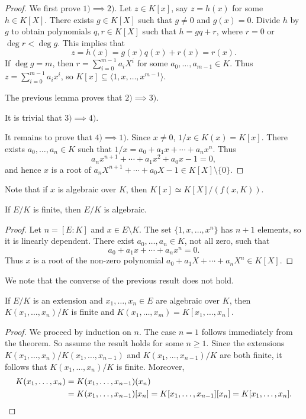 \begin{proof}
	We first prove $1)\implies 2)$. Let $z\in K[x]$, say $z=h(x)$ for some $h\in K[X]$. There exists
	$g\in K[X]$ such that $g\ne 0$ and $g(x)=0$. Divide $h$ by $g$ to obtain 
	polynomials $q,r\in K[X]$ such that $h=gq+r$, where $r=0$ or $\deg r<\deg g$. This implies that
	\[
		z=h(x)=g(x)q(x)+r(x)=r(x).
	\]
	If $\deg g=m$, then $r=\sum_{i=0}^{m-1}a_iX^i$ for some $a_0,\dots,a_{m-1}\in K$. Thus
	$z=\sum_{i=0}^{m-1}a_ix^i$, so $K[x]\subseteq\langle 1,x,\dots,x^{m-1}\rangle$. 

	The previous lemma proves that $2)\implies 3)$. 

	It is trivial that $3)\implies 4)$. 

	It remains to prove that $4)\implies 1)$. 
	Since $x\ne 0$, $1/x\in K(x)=K[x]$. There exists $a_0,\dots,a_n\in K$ such that
	$1/x=a_0+a_1x+\cdots+a_nx^n$. Thus
	\[
		a_nx^{n+1}+\cdots+a_1x^2+a_0x-1=0, 
	\]
	and hence $x$ is a root of $a_nX^{n+1}+\cdots+a_0X-1\in K[X]\setminus\{0\}$. 
\end{proof}

Note that if $x$ is algebraic over $K$, then
$K[x]\simeq K[X]/(f(x,K))$. 

\begin{corollary}
	If $E/K$ is finite, then $E/K$ is algebraic. 
\end{corollary}

\begin{proof}
	Let $n=[E:K]$ and $x\in E\setminus K$. The set $\{1,x,\dots,x^n\}$ has $n+1$ elements, so it is linearly dependent. 
	There exist $a_0,\dots,a_n\in K$, not all zero, such that
	\[
        a_0+a_1x+\cdots+a_nx^n=0.
        \]
        Thus $x$ is a root of the non-zero
	polynomial $a_0+a_1X+\cdots+a_nX^n\in K[X]$. 
\end{proof}

We note that the converse of the previous result does not hold. 

\begin{corollary}
	If $E/K$ is an extension and $x_1,\dots,x_n\in E$ 
	are algebraic over $K$, then 
	$K(x_1,\dots,x_n)/K$ is finite and
	$K(x_1,\dots,x_m)=K[x_1,\dots,x_n]$. 
\end{corollary}

\begin{proof}
	We proceed by induction on $n$. The case $n=1$ follows immediately from 
	the theorem. So assume the result holds for some $n\geq1$. Since the extensions 
	$K(x_1,\dots,x_n)/K(x_1,\dots,x_{n-1})$ and $K(x_1,\dots,x_{n-1})/K$ are
	both finite, it follows that $K(x_1,\dots,x_n)/K$ is finite. Moreover, 
	\begin{align*}
	K(x_1,\dots,x_n)&=K(x_1,\dots,x_{n-1})(x_n)\\
	&=K(x_1,\dots,x_{n-1})[x_n]=K[x_1,\dots,x_{n-1}][x_n]=K[x_1,\dots,x_n].\qedhere
    \end{align*}
\end{proof}


